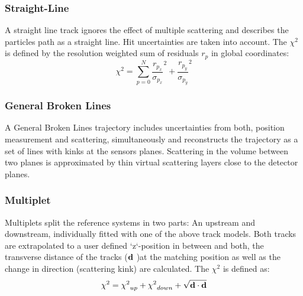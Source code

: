 \subsubsection*{Straight-Line}
A straight line track ignores the effect of multiple scattering and describes
the particles path as a straight line. Hit uncertainties are taken into account.
The $\chi^2$ is defined by the resolution weighted sum of residuals $r_p$ in global coordinates:
\begin{equation}
\chi^2 =  \sum_{p=0}^{N} {\frac{r_{p_x}}{\sigma_{p_x}}}^{2} + {\frac{r_{p_y}}{\sigma_{p_y}}}^{2}
\end{equation}

\subsubsection*{General Broken Lines}
A General Broken Lines trajectory \cite{Kleinwort:2012np} includes uncertainties from
both, position measurement and scattering, simultaneously and reconstructs the
trajectory as a set of lines with kinks at the sensors planes. Scattering in
the volume between two planes is approximated by thin virtual scattering
layers close to the detector planes. 

\subsubsection*{Multiplet}
Multiplets  split the reference systems in two parts: An upstream and downstream, individually fitted with one of the above track models.
Both tracks are  extrapolated to a user defined `z`-position in between and both, the transverse distance of the tracks ($\bold{d}$ )at the matching position as well as the change in direction (scattering kink) are calculated. The  $\chi^2$ is defined as:
\begin{equation}
	\chi^2 = {\chi^2}_{up} + {\chi^2}_{down} + \sqrt{\bold{d}\cdot\bold{d}} 
\end{equation}
